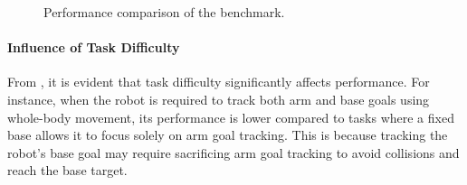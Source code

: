 \begin{figure}[htbp]
    \centering

    \caption{Performance comparison of the benchmark.}
    \label{fig: benchmark_performance_fixed}
\end{figure}
\paragraph{Influence of Task Difficulty}  
From , it is evident that task difficulty significantly affects performance. For instance, when the robot is required to track both arm and base goals using whole-body movement, its performance is lower compared to tasks where a fixed base allows it to focus solely on arm goal tracking. This is because tracking the robot's base goal may require sacrificing arm goal tracking to avoid collisions and reach the base target.  



